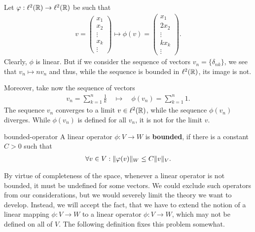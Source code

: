\begin{example}
  Let $\varphi:\ell^2(\mathbb R)\to\ell^2(\mathbb R)$ be such that
  \begin{gather*}
    v =
    \begin{pmatrix}
      x_1 \\ x_2 \\ \vdots \\ x_k \\ \vdots
    \end{pmatrix}
    \mapsto \phi(v) =
    \begin{pmatrix}
      x_1 \\ 2x_2 \\ \vdots \\ kx_k \\ \vdots
    \end{pmatrix}.
  \end{gather*}
  Clearly, $\phi$ is linear. But if we consider the sequence of
  vectors $v_n = \{\delta_{nk}\}$, we see that $v_n \mapsto n v_n$ and
  thus, while the sequence is bounded in $\ell^2(\mathbb R)$, its image is
  not.
  
  Moreover, take now the sequence of vectors
  \begin{gather*}
    v_n = \sum_{k=1}^n \frac1k
    \quad \mapsto \quad \phi(v_n) = \sum_{k=1}^n 1.
  \end{gather*}
  The sequence $v_n$ converges to a limit $v \in \ell^2(\mathbb R)$, while
  the sequence $\phi(v_n)$ diverges. While $\phi(v_n)$ is defined for
  all $v_n$, it is not for the limit $v$.
\end{example}

\begin{Definition}{bounded-operator}
  A linear operator $\phi: V\to W$ is \textbf{bounded}, if there is a constant
  $C > 0$ such that
  \begin{gather*}
    \forall v\in V: \lVert\varphi(v)\rVert_W \le C \lVert v\vphantom{()}\rVert_V.
  \end{gather*}
\end{Definition}

\begin{remark}
  By virtue of completeness of the space, whenever a linear operator
  is not bounded, it must be undefined for some vectors. We could
  exclude such operators from our considerations, but we would
  severely limit the theory we want to develop. Instead, we will
  accept the fact, that we have to extend the notion of a linear
  mapping $\phi: V\to W$ to a linear operator $\phi: V\to W$, which
  may not be defined on all of $V$. The following definition fixes
  this problem somewhat.
\end{remark}

